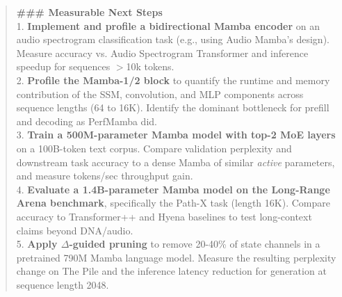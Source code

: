 \begin{quote}
\begin{tcolorbox}[breakable,colback=almond!20!white, colframe=almond!60!black, title=\textbf{Case Study (Mamba: Linear-Time Sequence Modeling with Selective State Spaces)}]
        \textbf{\#\#\# Measurable Next Steps}\\
        1. \textbf{Implement and profile a bidirectional Mamba encoder} on an audio spectrogram classification task (e.g., using Audio Mamba's design). Measure accuracy vs. Audio Spectrogram Transformer and inference speedup for sequences $>$10k tokens.\\
        2. \textbf{Profile the Mamba-1/2 block} to quantify the runtime and memory contribution of the SSM, convolution, and MLP components across sequence lengths (64 to 16K). Identify the dominant bottleneck for prefill and decoding as PerfMamba did.\\
        3. \textbf{Train a 500M-parameter Mamba model with top-2 MoE layers} on a 100B-token text corpus. Compare validation perplexity and downstream task accuracy to a dense Mamba of similar \textit{active} parameters, and measure tokens/sec throughput gain.\\
        4. \textbf{Evaluate a 1.4B-parameter Mamba model on the Long-Range Arena benchmark}, specifically the Path-X task (length 16K). Compare accuracy to Transformer++ and Hyena baselines to test long-context claims beyond DNA/audio.\\
        5. \textbf{Apply $\Delta$-guided pruning} to remove 20-40\% of state channels in a pretrained 790M Mamba language model. Measure the resulting perplexity change on The Pile and the inference latency reduction for generation at sequence length 2048.
    \end{tcolorbox}
\end{quote}